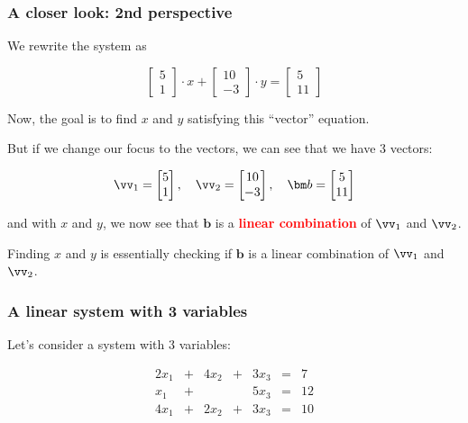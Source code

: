 \begin{frame}
  \frametitle{A closer look: 2nd perspective}
  We rewrite the system as

  \[
  \begin{bmatrix}
    5 \\ 1
  \end{bmatrix}
  \cdot x +
  \begin{bmatrix}
    10 \\ -3
  \end{bmatrix}
  \cdot y
  =
  \begin{bmatrix}
    5 \\ 11
  \end{bmatrix}
  \]

  \pause

  Now, the goal is to find $x$ and $y$ satisfying this ``vector'' equation.

  \pause

  But if we change our focus to the vectors, we can see that we have 3 vectors:

  \[
  \vv_1=
  \begin{bmatrix}
    5 \\ 1
  \end{bmatrix},
  \ \ \
  \vv_2 = 
  \begin{bmatrix}
    10 \\ -3
  \end{bmatrix},
  \ \ \
  {\bm b} =
  \begin{bmatrix}
    5 \\ 11
  \end{bmatrix}
  \]

  \pause

  and with $x$ and $y$, we now see that ${\bm b}$ is a \textcolor{red}{\bf linear combination} of $\vv_1$ and $\vv_2$.
  
  Finding $x$ and $y$ is essentially checking if ${\bm b}$ is a linear combination of $\vv_1$ and $\vv_2$.
\end{frame}

\begin{frame}
  \frametitle{A linear system with 3 variables}
  Let's consider a system with 3 variables:

  \[
  \begin{array}{rcrcrcl}
    2x_1 & + & 4x_2 & + & 3x_3 & = & 7 \\
    x_1 & + &  &  & 5x_3 & = & 12 \\
    4x_1 & + & 2x_2 & + & 3x_3 & = & 10
  \end{array}
  \]

  \vspace{2in}

\end{frame}

